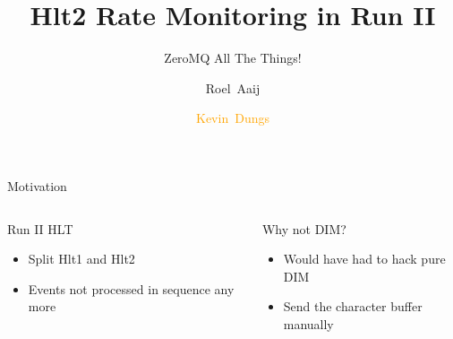 \documentclass[aspectratio=1610,compress,titleprogressbar]{beamer}
\title{Hlt2 Rate Monitoring in Run II}
\subtitle{ZeroMQ All The Things!}
\author[K.~Dungs]{Roel~Aaij\inst{1} \and \textcolor{orange}{Kevin~Dungs\inst{2}}}
\institute{\inst{1} CERN \and \inst{2} TU Dortmund}
\begin{document}
\maketitle

\begin{frame}{Motivation}
  \begin{columns}[t]
    \begin{column}{.5\textwidth}
      \begin{block}{Run II HLT}
        \begin{itemize}
          \item Split Hlt1 and Hlt2
          \item Events not processed in sequence any more
        \end{itemize}
      \end{block}
    \end{column}
    \begin{column}{.5\textwidth}
      \begin{block}{Why not DIM?}
        \begin{itemize}
          \item Would have had to hack pure DIM
          \item Send the character buffer manually
        \end{itemize}
      \end{block}
    \end{column}
  \end{columns}
\end{frame}
\end{document}
